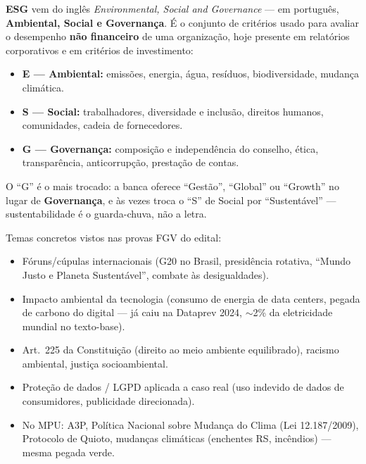\begin{conceito}
\textbf{ESG} vem do inglês \emph{Environmental, Social and Governance} ---
em português, \textbf{Ambiental, Social e Governança}. É o conjunto de
critérios usado para avaliar o desempenho \textbf{não financeiro} de uma
organização, hoje presente em relatórios corporativos e em critérios de
investimento:

\begin{itemize}
\item \textbf{E --- Ambiental:} emissões, energia, água, resíduos,
biodiversidade, mudança climática.
\item \textbf{S --- Social:} trabalhadores, diversidade e inclusão, direitos
humanos, comunidades, cadeia de fornecedores.
\item \textbf{G --- Governança:} composição e independência do conselho,
ética, transparência, anticorrupção, prestação de contas.
\end{itemize}

O ``G'' é o mais trocado: a banca oferece ``Gestão'', ``Global'' ou
``Growth'' no lugar de \textbf{Governança}, e às vezes troca o ``S'' de
Social por ``Sustentável'' --- sustentabilidade é o guarda-chuva, não a
letra.
\end{conceito}

Temas concretos vistos nas provas FGV do edital:

\begin{itemize}
\item Fóruns/cúpulas internacionais (G20 no Brasil, presidência rotativa,
``Mundo Justo e Planeta Sustentável'', combate às desigualdades).
\item Impacto ambiental da tecnologia (consumo de energia de data centers,
pegada de carbono do digital --- já caiu na Dataprev 2024, ${\sim}$2\% da
eletricidade mundial no texto-base).
\item Art.\ 225 da Constituição (direito ao meio ambiente equilibrado),
racismo ambiental, justiça socioambiental.
\item Proteção de dados / LGPD aplicada a caso real (uso indevido de dados
de consumidores, publicidade direcionada).
\item No MPU: A3P, Política Nacional sobre Mudança do Clima (Lei
12.187/2009), Protocolo de Quioto, mudanças climáticas (enchentes RS,
incêndios) --- mesma pegada verde.
\end{itemize}

